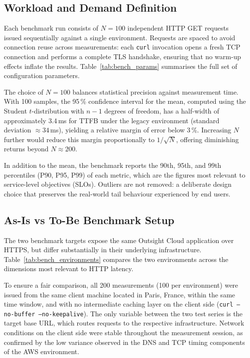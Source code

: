 \subsection{Workload and Demand Definition}

Each benchmark run consists of $N = 100$ independent HTTP GET requests
issued sequentially against a single environment.
Requests are spaced to avoid connection reuse across measurements: each
\texttt{curl} invocation opens a fresh TCP connection and performs a
complete TLS handshake, ensuring that no warm-up effects inflate the
results.
Table~\ref{tab:bench_params} summarises the full set of configuration
parameters.



The choice of $N = 100$ balances statistical precision against
measurement time.
With 100 samples, the 95\,\% confidence interval for the mean, computed
using the Student $t$-distribution with $n - 1$ degrees of freedom, has
a half-width of approximately 3.4\,ms for TTFB under the legacy
environment (standard deviation $\approx 34$\,ms), yielding a relative
margin of error below 3\,\%.
Increasing $N$ further would reduce this margin proportionally to
$1/\sqrt{N}$, offering diminishing returns beyond $N \approx 200$.

In addition to the mean, the benchmark reports the 90th, 95th, and 99th
percentiles (P90, P95, P99) of each metric, which are the figures most
relevant to service-level objectives (SLOs).
Outliers are not removed: a deliberate design choice that preserves the
real-world tail behaviour experienced by end users.

\subsection{As-Is vs To-Be Benchmark Setup}

The two benchmark targets expose the same Outsight Cloud application
over HTTPS, but differ substantially in their underlying infrastructure.
Table~\ref{tab:bench_environments} compares the two environments across
the dimensions most relevant to HTTP latency.



To ensure a fair comparison, all 200 measurements (100 per environment)
were issued from the same client machine located in Paris, France,
within the same time window, and with no intermediate caching layer
on the client side (\texttt{curl --no-buffer --no-keepalive}).
The only variable between the two test series is the target base URL,
which routes requests to the respective infrastructure.
Network conditions on the client side were stable throughout the
measurement session, as confirmed by the low variance observed in
the DNS and TCP timing components of the AWS environment.

